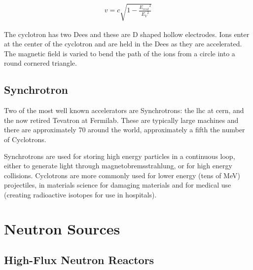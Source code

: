 \begin{equation}
\begin{split}
v = c \sqrt{1 - \frac{{E_{rest}}^2}{{E_V}^2}}
\end{split}
\label{eq:eqGammaFunction}
\end{equation}

The cyclotron has two Dees and these are D shaped hollow electrodes.  Ions enter at the center of the cyclotron and are held in the Dees as they are accelerated.  The magnetic field is varied to bend the path of the ions from a circle into a round cornered triangle.




\FloatBarrier
\subsection{Synchrotron}

Two of the most well known accelerators are Synchrotrons: the \acrlong{lhc} at \acrlong{cern}, and the now retired Tevatron at Fermilab.  These are typically large machines and there are approximately 70 around the world\cite{synchrotrons}, approximately a fifth the number of Cyclotrons.  

Synchrotrons are used for storing high energy particles in a continuous loop, either to generate light through magnetobremsstrahlung, or for high energy collisions.  Cyclotrons are more commonly used for lower energy (tens of MeV) projectiles, in materials science for damaging materials and for medical use (creating radioactive isotopes for use in hospitals).












\FloatBarrier
\section{Neutron Sources}

\FloatBarrier
\subsection{High-Flux Neutron Reactors}

